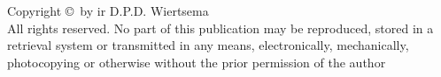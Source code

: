 \newpage
\vspace*{15cm}  \thispagestyle{empty}

\noindent Copyright \copyright\ by ir D.P.D. Wiertsema \\


\noindent All rights reserved. No part of this publication may be
reproduced, stored in a retrieval system or transmitted in any
means, electronically, mechanically, photocopying or otherwise
without the prior permission of the author \cleardoublepage
